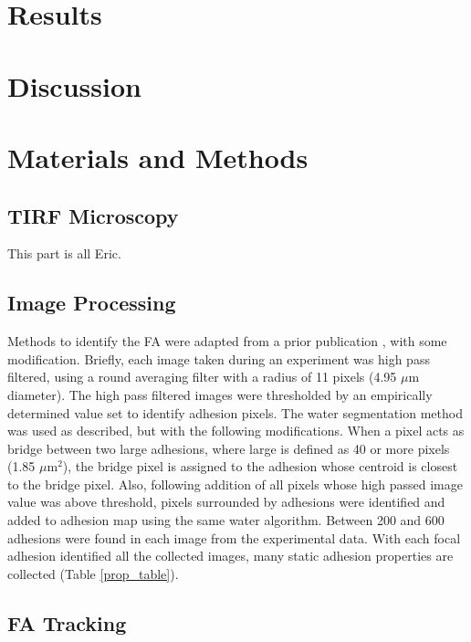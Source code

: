\documentclass[10pt,draft]{article}
\begin{document}
\section*{Results}



\section*{Discussion}

\section*{Materials and Methods}

\subsection*{TIRF Microscopy}

This part is all Eric.

\subsection*{Image Processing}

Methods to identify the FA were adapted from a prior publication \cite{Zamir1999}, with some modification. Briefly, each image taken during an experiment was high pass filtered, using a round averaging filter with a radius of 11 pixels (4.95 $\mu$m diameter). The high pass filtered images were thresholded by an empirically determined value set to identify adhesion pixels. The water segmentation method was used as described, but with the following modifications. When a pixel acts as bridge between two large adhesions, where large is defined as 40 or more pixels (1.85 $\mu$m$^2$), the bridge pixel is assigned to the adhesion whose centroid is closest to the bridge pixel. Also, following addition of all pixels whose high passed image value was above threshold, pixels surrounded by adhesions were identified and added to adhesion map using the same water algorithm. Between 200 and 600 adhesions were found in each image from the experimental data. With each focal adhesion identified all the collected images, many static adhesion properties are collected (Table \ref{prop_table}).

\subsection*{FA Tracking}
\end{document}
